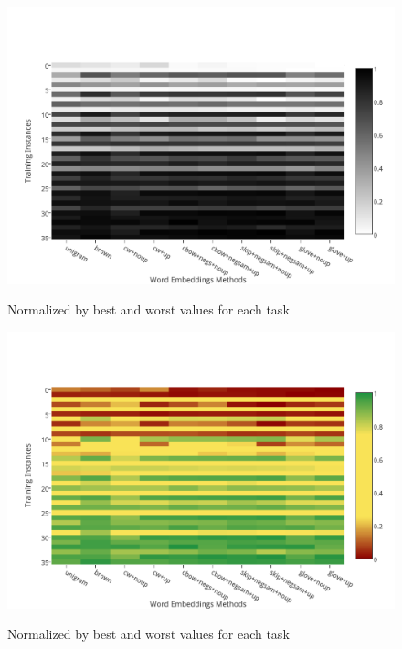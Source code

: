 \begin{figure}
\caption{Normalized by best and worst values for each task}
\centering
\includegraphics[scale=0.8]{plots/heat-map}    	
\label{fig:heatmap}
\end{figure}

\begin{figure}
\caption{Normalized by best and worst values for each task}
\centering
\includegraphics[scale=0.8]{plots/heat-map-color}    	
\label{fig:heatmap}
\end{figure}


